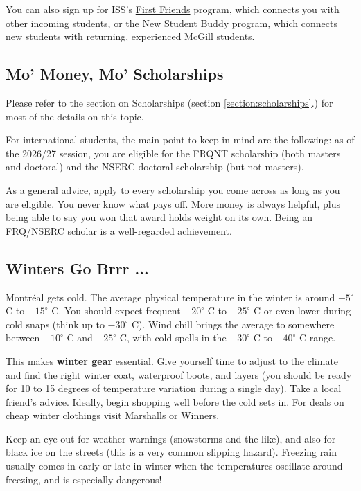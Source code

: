 You can also sign up for ISS's \href{https://www.mcgill.ca/internationalstudents/pre-arrival/first-friends}{First Friends} program, which connects you with other incoming students, or the \href{https://www.mcgill.ca/internationalstudents/pre-arrival/buddy}{New Student Buddy} program, which connects new students with returning, experienced McGill students.


\subsection{Mo' Money, Mo' Scholarships}
Please refer to the section on Scholarships (section \hyperref[section:scholarships]{\textcolor{purble}{\ref*{section:scholarships}}}.) for most of the details on this topic.

For international students, the main point to keep in mind are the following: as of the 2026/27 session, you are eligible for the FRQNT scholarship (both masters and doctoral) and the NSERC doctoral scholarship (but not masters).

As a general advice, apply to every scholarship you come across as long as you are eligible. You never know what pays off. More money is always helpful, plus being able to say you won that award holds weight on its own. Being an FRQ/NSERC scholar is a well-regarded achievement.

\subsection{Winters Go Brrr ... } 
Montr\'eal gets cold. The average physical temperature in the winter is around $-5^\circ$ C to $-15^\circ$ C. You should expect frequent $-20^\circ$ C to $-25^\circ$ C or even lower during cold snaps (think up to $-30^\circ$ C). Wind chill brings the average to somewhere between $-10^\circ$ C and $-25^\circ$ C, with cold spells in the $-30^\circ$ C to $-40^\circ$ C range.

This makes \textbf{winter gear} essential. Give yourself time to adjust to the climate and find the right winter coat, waterproof boots, and layers (you should be ready for 10 to 15 degrees of temperature variation during a single day). Take a local friend's advice. Ideally, begin shopping well before the cold sets in. For deals on cheap winter clothings visit Marshalls or Winners.

Keep an eye out for weather warnings (snowstorms and the like), and also for black ice on the streets (this is a very common slipping hazard). Freezing rain usually comes in early or late in winter when the temperatures oscillate around freezing, and is especially dangerous!

